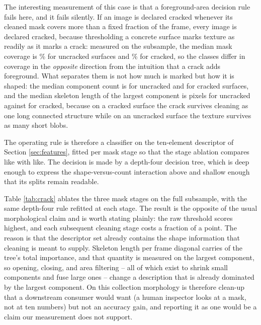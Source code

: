 \documentclass{ieeeaccess}
\begin{document}
The interesting measurement of this case is that a foreground-area decision rule
fails here, and it fails silently. If an image is declared cracked whenever its
cleaned mask covers more than a fixed fraction of the frame, every image is
declared cracked, because thresholding a concrete surface marks texture as
readily as it marks a crack: measured on the subsample, the median mask coverage
is \crackCovNeg{}\% for uncracked surfaces and \crackCovPos{}\% for cracked, so the classes
differ in coverage in the \emph{opposite} direction from the intuition that a
crack adds foreground. What separates them is not how much is marked but how it
is shaped: the median component count is \crackCompNeg{} for uncracked and
\crackCompPos{} for cracked
surfaces, and the median skeleton length of the largest component is \crackSkelNeg{}
pixels for uncracked against \crackSkelPos{} for cracked, because on a cracked surface the
crack survives cleaning as one long connected structure while on an uncracked
surface the texture survives as many short blobs.

The operating rule is therefore a classifier on the ten-element descriptor of
Section \ref{sec:features}, fitted per mask stage so that the stage ablation
compares like with like. The decision is made by a depth-four decision tree,
which is deep enough to express the shape-versus-count interaction above and
shallow enough that its splits remain readable.

Table \ref{tab:crack} ablates the three mask stages on the full subsample, with the
same depth-four rule refitted at each stage. The result is the opposite of the
usual morphological claim and is worth stating plainly: the raw threshold scores
highest, and each subsequent cleaning stage costs a fraction of a point. The
reason is that the descriptor set already contains the shape information that
cleaning is meant to supply. Skeleton length per frame diagonal carries
\crackTopImportance{} of the tree's total importance, and that quantity is
measured on the largest component, so opening, closing, and area filtering -- all
of which exist to shrink small components and fuse large ones -- change a
description that is already dominated by the largest component. On this
collection morphology is therefore clean-up that a downstream consumer would
want (a human inspector looks at a mask, not at ten numbers) but not an accuracy
gain, and reporting it as one would be a claim our measurement does not support.

\begin{table}[!t]
\centering
\caption{Case 1, mask-stage ablation on \crackImages{} images. Precision,
recall, and F1 refer to the crack class.}
\label{tab:crack}
\footnotesize

\end{table}
\end{document}

